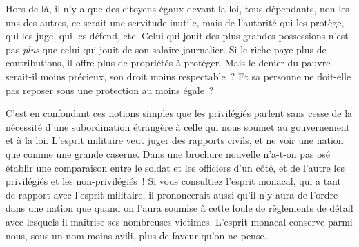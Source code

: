 \documentclass[french,twoside]{book} %
\begin{document}
Hors de là, il n’y a que des citoyens égaux devant la loi, tous dépendants, non les uns des autres, ce serait une servitude inutile, mais de l’autorité qui les protège, qui les juge, qui les défend, etc. Celui qui jouit des plus grandes possessions n’est pas {\itshape plus} que celui qui jouit de son salaire journalier. Si le riche paye plus de contributions, il offre plus de propriétés à protéger. Mais le denier du pauvre serait-il moins précieux, son droit moins respectable ? Et sa personne ne doit-elle pas reposer sous une protection au moins égale ?\par
C’est en confondant ces notions simples que les privilégiés parlent sans cesse de la nécessité d’une subordination étrangère à celle qui nous soumet au gouvernement et à la loi. L’esprit militaire veut juger des rapports civils, et ne voir une nation que comme une grande caserne. Dans une brochure nouvelle n’a-t-on pas osé établir une comparaison entre le soldat et les officiers d’un côté, et de l’autre les privilégiés et les non-privilégiés ! Si vous consultiez l’esprit monacal, qui a tant de rapport avec l’esprit militaire, il prononcerait aussi qu’il n’y aura de l’ordre dans une nation que quand on l’aura soumise à cette foule de règlements de détail avec lesquels il maîtrise ses nombreuses victimes. L’esprit monacal conserve parmi nous, sous un nom moins avili, plus de faveur qu’on ne pense.\par
\end{document}
